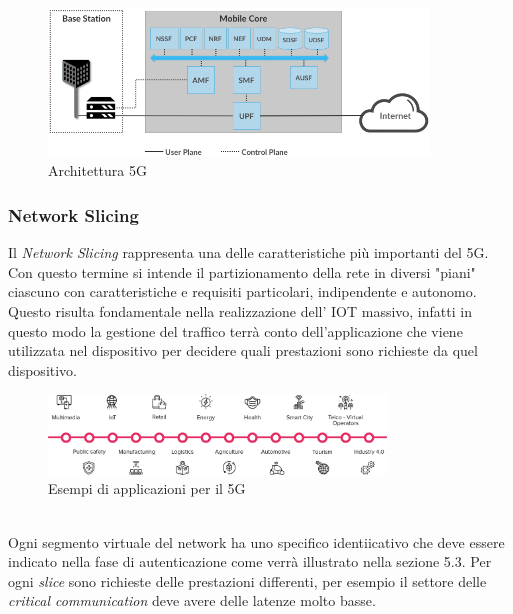 \begin{figure}[ht]
    \centering
    \includegraphics[width=0.9\textwidth]{images/5g-planes.png}
    \caption{Architettura 5G\cite{5g-approach}}
\end{figure}

\clearpage

\subsubsection{Network Slicing}
Il \textit{Network Slicing} rappresenta una delle caratteristiche più importanti del 5G. Con questo termine si intende il partizionamento della
rete in diversi "piani" ciascuno con caratteristiche e requisiti particolari, indipendente e autonomo. Questo risulta fondamentale nella realizzazione 
dell' IOT massivo, infatti in questo modo la gestione del traffico terrà conto dell'applicazione che viene utilizzata nel dispositivo per decidere quali prestazioni sono 
richieste da quel dispositivo.
\begin{figure}[ht]
    \centering
    \includegraphics[width=0.8\textwidth]{images/5g-eg-of-use.png}
    \caption{Esempi di applicazioni per il 5G}
\end{figure}\\
Ogni segmento virtuale del network ha uno specifico identiicativo che deve essere indicato nella fase di autenticazione come verrà illustrato nella sezione 5.3. Per ogni \textit{slice} sono 
richieste delle prestazioni differenti, per esempio il settore delle \textit{critical communication} deve avere delle latenze molto basse.
